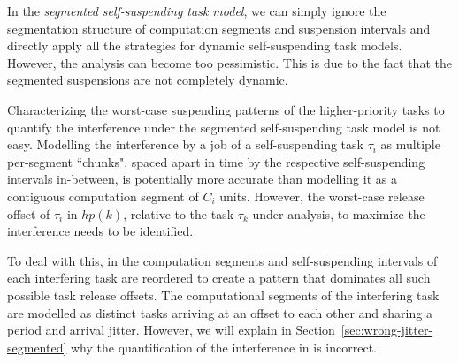 \label{sec:model-interfering-improving}

In the \emph{segmented self-suspending task model}, we can simply ignore the segmentation structure of computation segments and suspension intervals 
and directly apply all the strategies for dynamic self-suspending task models. However, the analysis can become too pessimistic. This is due to the fact 
that the segmented suspensions are not completely dynamic. 


Characterizing the worst-case 
suspending patterns of the higher-priority tasks to quantify the interference under the segmented self-suspending task model is not easy. 
Modelling the interference by a job of a self-suspending task $\tau_i$ as multiple per-segment ``chunks", spaced apart in time by 
the respective self-suspending intervals in-between, is potentially more accurate than modelling it as a contiguous computation segment of $C_i$ units.
However, the worst-case release offset of $\tau_i$ in $hp(k)$, relative to the task $\tau_k$ under analysis, to maximize the interference needs to be identified.

To deal with this, in \cite{RTCSA-BletsasA05} the computation segments and self-suspending intervals of each interfering task are reordered 
to create a pattern that dominates all such possible task release offsets. The computational segments of the interfering task are modelled 
as distinct tasks arriving at an offset to each other and sharing a period and arrival jitter. However, we will explain in 
Section~\ref{sec:wrong-jitter-segmented} why the quantification of the interference in \cite{RTCSA-BletsasA05} is incorrect. 

